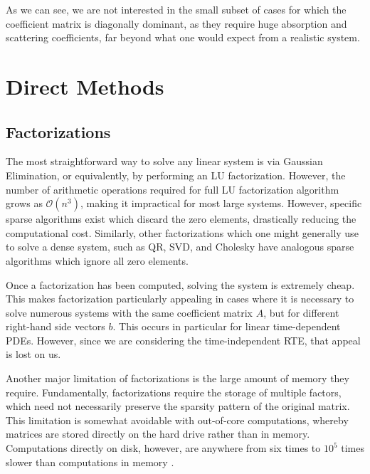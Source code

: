 \documentclass[10pt]{article}
\begin{document}
\begin{multicols}{2}
As we can see, we are not interested in the small subset of cases for which the coefficient matrix is diagonally dominant, as they require huge absorption and scattering coefficients, far beyond what one would expect from a realistic system.

\section{Direct Methods}
\subsection{Factorizations}
The most straightforward way to solve any linear system is via Gaussian Elimination, or equivalently, by performing an LU factorization.
However, the number of arithmetic operations required for full LU factorization algorithm grows as $\mathcal{O}(n^3)$, making it impractical for most large systems.
However, specific sparse algorithms exist which discard the zero elements, drastically reducing the computational cost.
Similarly, other factorizations which one might generally use to solve a dense system, such as QR, SVD, and Cholesky have analogous sparse algorithms which ignore all zero elements.

Once a factorization has been computed, solving the system is extremely cheap.
This makes factorization particularly appealing in cases where it is necessary to solve numerous systems with the same coefficient matrix $A$, but for different right-hand side vectors $b$.
This occurs in particular for linear time-dependent PDEs.
However, since we are considering the time-independent RTE, that appeal is lost on us.

Another major limitation of factorizations is the large amount of memory they require.
Fundamentally, factorizations require the storage of multiple factors, which need not necessarily preserve the sparsity pattern of the original matrix.
This limitation is somewhat avoidable with out-of-core computations, whereby matrices are stored directly on the hard drive rather than in memory.
Computations directly on disk, however, are anywhere from six times to $10^5$ times slower than computations in memory \citep{jacobs_pathologies_2009}.


\end{multicols}
\end{document}

